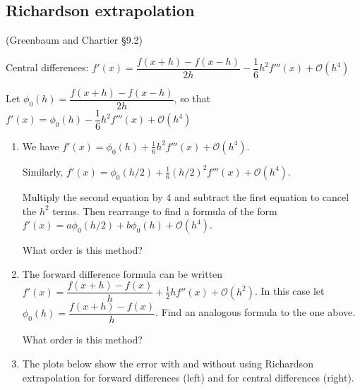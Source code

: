 \documentclass[12pt,letterpaper,noanswers]{exam}
\begin{document}
\subsection*{Richardson extrapolation}

\begin{tcolorbox}

(Greenbaum and Chartier \S 9.2)

Central differences: $f'(x) = \dfrac{f(x+h)-f(x-h)}{2h} - \dfrac{1}{6}h^2 f'''(x) + \mathcal{O}(h^4)$

Let $\phi_0(h) = \dfrac{f(x+h)-f(x-h)}{2h}$, so that $f'(x) = \phi_0(h) - \dfrac{1}{6}h^2 f'''(x) + \mathcal{O}(h^4)$
\end{tcolorbox}
\begin{enumerate}[resume=classQ]
\item We have $f'(x) = \phi_0(h) + \frac{1}{6}h^2 f'''(x) + \mathcal{O}(h^4)$.

Similarly, $f'(x) = \phi_0(h/2) + \frac{1}{6}(h/2)^2 f'''(x) +  \mathcal{O}(h^4)$.

Multiply the second equation by $4$ and subtract the first equation to cancel the $h^2$ terms.  Then rearrange to find a formula of the form $f'(x) = a\phi_0(h/2) + b\phi_0(h) + \mathcal{O}(h^4)$.

What order is this method?
\vspace{1in}

\item The forward difference formula can be written $f'(x) = \dfrac{f(x+h)-f(x)}{h} + \frac{1}{2} hf''(x) + \mathcal{O}(h^2)$.  In this case let $\phi_0(h) = \dfrac{f(x+h)-f(x)}{h}$.  Find an analogous formula to the one above.

What order is this method?

\vspace{1in}

\item The plots below show the error with and without using Richardson extrapolation for forward differences (left) and for central differences (right).
\end{enumerate}
\end{document}
